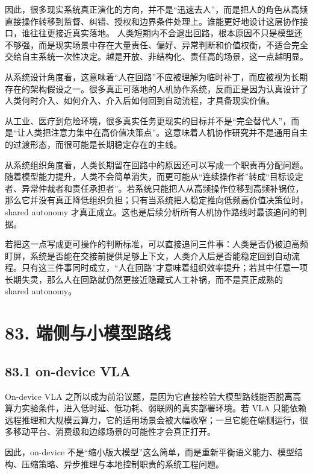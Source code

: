 因此，很多现实系统真正演化的方向，并不是“迅速去人”，而是把人的角色从高频直接操作转移到监督、纠错、授权和边界条件处理上。谁能更好地设计这层协作接口，谁往往更接近真实落地。 人类短期内不会退出回路，根本原因不只是模型还不够强，而是现实场景中存在大量责任、偏好、异常判断和价值权衡，不适合完全交给自主系统一次性决定。越是开放、非结构化、责任高的场景，这一点越明显。

从系统设计角度看，这意味着“人在回路”不应被理解为临时补丁，而应被视为长期存在的架构假设之一。很多真正可落地的人机协作系统，反而正是因为认真设计了人类何时介入、如何介入、介入后如何回到自动流程，才具备现实价值。

从工业、医疗到危险环境，很多真实任务更现实的目标并不是“完全替代人”，而是“让人类把注意力集中在高价值决策点”。这意味着人机协作研究并不是通用自主的过渡形态，而很可能是长期稳定存在的主线。

从系统组织角度看，人类长期留在回路中的原因还可以写成一个职责再分配问题。随着模型能力提升，人类不会简单消失，而更可能从“连续操作者”转成“目标设定者、异常仲裁者和责任承担者”。若系统只能把人从高频操作位移到高频补锅位，那么它并没有真正降低组织负担；只有当系统把人稳定推向低频高价值决策位时，shared autonomy 才真正成立。这也是后续分析所有人机协作路线时最该追问的判据。

若把这一点写成更可操作的判断标准，可以直接追问三件事：人类是否仍被迫高频盯屏，系统是否能在交接前提供足够上下文，人类介入后是否能稳定回到自动流程。只有这三件事同时成立，“人在回路”才意味着组织效率提升；若其中任意一项长期失灵，那么人在回路就仍然更接近隐藏式人工补锅，而不是真正成熟的 shared autonomy。

\chapter*{83. 端侧与小模型路线}

\section*{83.1 on-device VLA}


On-device VLA 之所以成为前沿议题，是因为它直接检验大模型路线能否脱离高算力实验条件，进入低时延、低功耗、弱联网的真实部署环境。若 VLA 只能依赖远程推理和大规模云算力，它的适用场景会被大幅收窄；一旦它能在端侧运行，很多移动平台、消费级和边缘场景的可能性才会真正打开。

因此，on-device 不是“缩小版大模型”这么简单，而是重新平衡语义能力、模型结构、压缩策略、异步推理与本地控制职责的系统工程问题。

